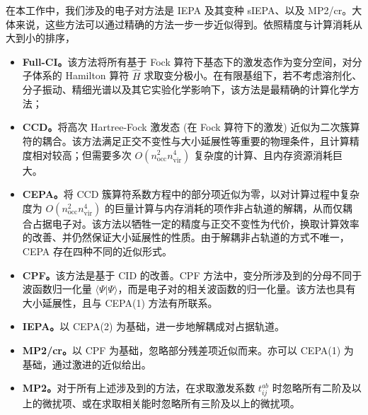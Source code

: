 在本工作中，我们涉及的电子对方法是 IEPA 及其变种 sIEPA、以及 MP2/cr。大体来说，这些方法可以通过精确的方法一步一步近似得到。依照精度与计算消耗从大到小的排序，
\begin{itemize}[nosep]
  \item \textbf{Full-CI。}该方法将所有基于 Fock 算符下基态下的激发态作为变分空间，对分子体系的 Hamilton 算符 $\hat H$ 求取变分极小。在有限基组下，若不考虑溶剂化、分子振动、精细光谱以及其它实验化学影响下，该方法是最精确的计算化学方法；
  \item \textbf{CCD。}将高次 Hartree-Fock 激发态 (在 Fock 算符下的激发) 近似为二次簇算符的耦合。该方法满足正交不变性与大小延展性等重要的物理条件，且计算精度相对较高；但需要多次 $O(n_\mathrm{occ}^2 n_\mathrm{vir}^4)$ 复杂度的计算、且内存资源消耗巨大。
  \item \textbf{CEPA。}将 CCD 簇算符系数方程中的部分项近似为零，以对计算过程中复杂度为 $O(n_\mathrm{occ}^2 n_\mathrm{vir}^4)$ 的巨量计算与内存消耗的项作非占轨道的解耦，从而仅耦合占据电子对。该方法以牺牲一定的精度与正交不变性为代价，换取计算效率的改善、并仍然保证大小延展性的性质。由于解耦非占轨道的方式不唯一，CEPA 存在四种不同的近似形式。
  \item \textbf{CPF。}该方法是基于 CID 的改善。CPF 方法中，变分所涉及到的分母不同于波函数归一化量 $\langle \Psi | \Psi \rangle$，而是电子对的相关波函数的归一化量。该方法也具有大小延展性，且与 CEPA(1) 方法有所联系。
  \item \textbf{IEPA。}以 CEPA(2) 为基础，进一步地解耦成对占据轨道。
  \item \textbf{MP2/cr。}以 CPF 为基础，忽略部分残差项近似而来。亦可以 CEPA(1) 为基础，通过激进的近似给出。
  \item \textbf{MP2。}对于所有上述涉及到的方法，在求取激发系数 $t_{ij}^{ab}$ 时忽略所有二阶及以上的微扰项、或在求取相关能时忽略所有三阶及以上的微扰项。
\end{itemize}

